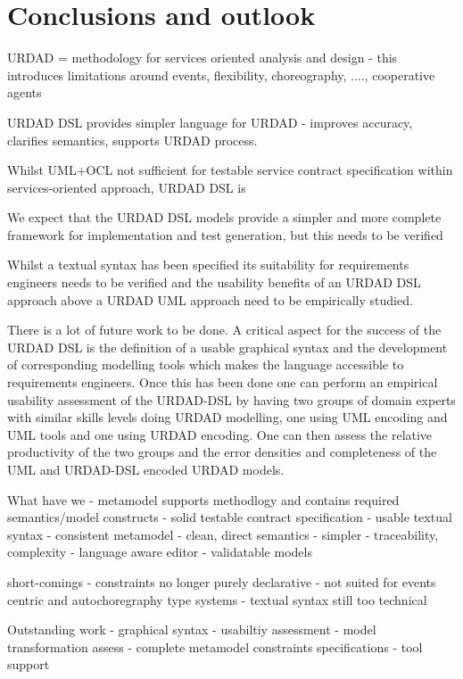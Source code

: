 \section{Conclusions and outlook \label{sec:conclusionsAndOutlook}}


URDAD = methodology for services oriented analysis and design - this introduces limitations around events, flexibility, choreography, ...., cooperative agents



URDAD DSL provides simpler language for URDAD - improves accuracy, clarifies semantics, supports URDAD process.

Whilst UML+OCL not sufficient for testable service contract specification within services-oriented approach, URDAD DSL is

We expect that the URDAD DSL models provide a simpler and more complete framework for implementation and test generation, but this needs to be verified

Whilst a textual syntax has been specified its suitability for requirements engineers needs to be verified and the usability benefits of an URDAD DSL approach above a URDAD UML approach need to be empirically studied.


There is a lot of future work to be done. A critical aspect for the success of the URDAD DSL is the definition of a usable graphical syntax and the development of corresponding modelling tools which makes the language accessible to requirements engineers. Once this has been done one can perform an empirical usability assessment of the URDAD-DSL by having two groups of domain experts with similar skills levels doing URDAD modelling, one using UML encoding and UML tools and one using URDAD encoding. One can then assess the relative productivity of the two groups and the error densities and completeness of the UML and URDAD-DSL encoded URDAD models.

What have we
  - metamodel supports methodlogy and contains required semantics/model constructs
  - solid testable contract specification
  - usable textual syntax
  - consistent metamodel
  - clean, direct semantics
  - simpler
  - traceability, complexity
  - language aware editor
  - validatable models

short-comings
  - constraints no longer purely declarative
  - not suited for events centric and autochoregraphy type systems
  - textual syntax still too technical

Outstanding work
  - graphical syntax 
  - usabiltiy assessment
  - model transformation assess
  - complete metamodel constraints specifications
  - tool support
  